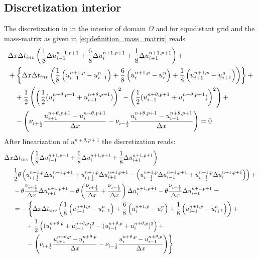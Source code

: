 \subsection{Discretization interior}
The discretization in \deltaformulation in the interior of domain $\Omega$ and
for equidistant grid and the mass-matrix as given in \autoref{eq:definition_mass_matrix} reads
\begin{align}
    & \Delta x \Delta t_{inv} \left(\frac{1}{8} \Delta u^{n+1,p+1}_{i-1} + \frac{6}{8} \Delta u^{n+1,p+1}_{i} + \frac{1}{8} \Delta u^{n+1,p+1}_{i+1}\right)  +
    \nonumber \\*
    &
    + \left\{ \Delta x \Delta t_{inv} \left( \frac{1}{8}\left( u^{n+1,p}_{i-1} - u^{n}_{i-1} \right) + \frac{6}{8}\left( u^{n+1,p}_{i} - u^{n}_{i} \right) + \frac{1}{8}\left( u^{n+1,p}_{i+1} - u^{n}_{i+1} \right) \right)  \right\} +
    \nonumber \\*
    &\quad  + \frac{1}{2}  \left(
    \left( \frac{1}{2} (u^{n+\theta, p+1}_{i} + u^{n+\theta,p+1}_{i+1}) \right)^2 -
    \left( \frac{1}{2} (u^{n+\theta, p+1}_{i-1} + u^{n+\theta,p+1}_{i}) \right)^2
    \right) +
    \nonumber \\*
    &\quad - \left( \nu_{i+\frac{1}{2}} \frac{u^{n+\theta, p+1}_{i+1} - u^{n+\theta, p+1}_{i}}{\Delta x} - \nu_{i-\frac{1}{2}} \frac{u^{n+\theta, p+1}_{i} - u^{n+\theta, p+1}_{i-1}}{\Delta x}\right) = 0
\end{align}
After linearization of $u^{n+\theta,p+1}$ the discretization reads:
%
\begin{align}
    \Delta x & \Delta t_{inv}  \left(\frac{1}{8} \Delta u^{n+1,p+1}_{i-1} + \frac{6}{8} \Delta u^{n+1,p+1}_{i} + \frac{1}{8} \Delta u^{n+1,p+1}_{i+1}\right)
    \nonumber \\*
    & \frac{1}{2} \theta \left( u^{n+1,p}_{i+\frac{1}{2}} \Delta u^{n+1,p+1}_{i} + u^{n+1,p}_{i+\frac{1}{2}} \Delta u^{n+1,p+1}_{i+1}
    - \left( u^{n+1,p}_{i-\frac{1}{2}}\Delta u^{n+1,p+1}_{i-1} + u^{n+1,p}_{i-\frac{1}{2}} \Delta u^{n+1,p+1}_{i}  \right)\right) +
    \nonumber \\*
    & - \theta \frac{\nu_{i+\frac{1}{2}}}{\Delta x} \Delta u^{n+1, p+1}_{i+1}
    + \theta \left( \frac{\nu_{i+\frac{1}{2}}}{\Delta x} + \frac{\nu_{i-\frac{1}{2}}}{\Delta x} \right) \Delta u^{n+1, p+1}_{i} - \theta \frac{\nu_{i-\frac{1}{2}}}{\Delta x} \Delta u^{n+1, p+1}_{i-1}
    =
    \nonumber \\*
    & = -\left\{ \Delta x \Delta t_{inv} \left( \frac{1}{8}\left( u^{n+1,p}_{i-1} - u^{n}_{i-1} \right) + \frac{6}{8}\left( u^{n+1,p}_{i} - u^{n}_{i} \right) + \frac{1}{8}\left( u^{n+1,p}_{i+1} - u^{n}_{i+1} \right)\right) + \right.
    \nonumber \\*
    & \qquad + \frac{1}{2} \left((u^{n+\theta, p}_{i} + u^{n+\theta,p}_{i+1})^2 -  (u^{n+\theta, p}_{i-1} +u^{n+\theta,p}_{i})^2 \right) +
    \nonumber \\*
    &\qquad - \left. \left( \nu_{i+\frac{1}{2}} \frac{u^{n+\theta,p}_{i+1} - u^{n+\theta,p}_{i}}{\Delta x} - \nu_{i-\frac{1}{2}} \frac{u^{n+\theta,p}_{i} - u^{n+\theta,p}_{i-1}}{\Delta x}\right) \right\}
\end{align}

